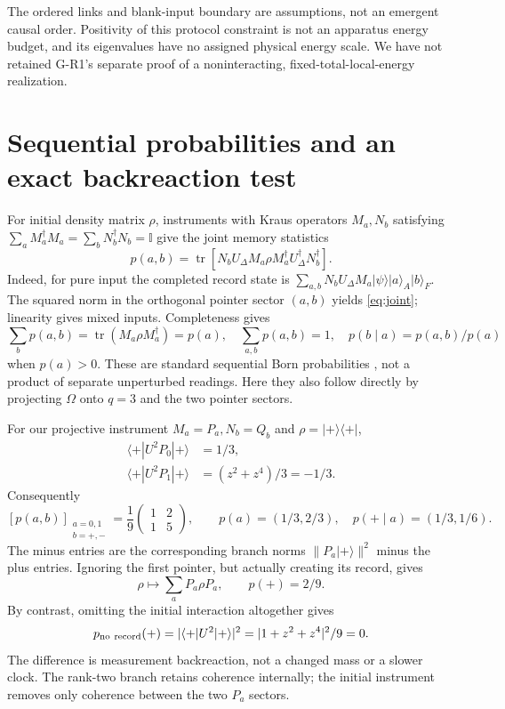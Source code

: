 \documentclass[11pt,a4paper]{article}
\newcommand{\id}{\mathbb I}
\newcommand{\tr}{\operatorname{tr}}
\newcommand{\ket}[1]{|#1\rangle}
\newcommand{\bra}[1]{\langle#1|}
\newcommand{\pr}[1]{\ket{#1}\bra{#1}}
\begin{document}
The ordered links and blank-input boundary are assumptions, not an
emergent causal order. Positivity of this protocol constraint is not
an apparatus energy budget, and its eigenvalues have no assigned
physical energy scale. We have not retained G-R1's separate proof
of a noninteracting, fixed-total-local-energy realization.

\newpage
\section{Sequential probabilities and an exact backreaction test}
For initial density matrix $\rho$, instruments with Kraus operators
$M_a,N_b$ satisfying $\sum_aM_a^\dagger M_a=\sum_bN_b^\dagger N_b=\id$
give the joint memory statistics
\begin{equation}\label{eq:joint}
 p(a,b)=\tr\!\left[
 N_bU_\Delta M_a\rho M_a^\dagger U_\Delta^\dagger N_b^\dagger
 \right] .
\end{equation}
Indeed, for pure input the completed record state is
$\sum_{a,b}N_bU_\Delta M_a\ket\psi\ket a_A\ket b_F$.
The squared norm in the orthogonal pointer sector $(a,b)$ yields
\eqref{eq:joint}; linearity gives mixed inputs. Completeness gives
\begin{equation}
 \sum_bp(a,b)=\tr(M_a\rho M_a^\dagger)=p(a),\quad
 \sum_{a,b}p(a,b)=1,\quad
 p(b\mid a)=p(a,b)/p(a)
\end{equation}
when $p(a)>0$. These are standard sequential Born probabilities
\cite{quantumtime}, not a product of separate unperturbed readings.
Here they also follow directly by projecting $\Omega$ onto $q=3$
and the two pointer sectors.

For our projective instrument $M_a=P_a,N_b=Q_b$ and $\rho=\pr+$,
\begin{align}
 \langle+|U^2P_0|+\rangle&=1/3,\\
 \langle+|U^2P_1|+\rangle&=(z^2+z^4)/3=-1/3 .
\end{align}
Consequently
\begin{equation}\label{eq:table}
 [p(a,b)]_{\substack{a=0,1\\b=+,-}}
 =\frac19\begin{pmatrix}1&2\\1&5\end{pmatrix},\qquad
 p(a)=(1/3,2/3),\quad
 p(+\mid a)=(1/3,1/6).
\end{equation}
The minus entries are the corresponding branch norms
$\|P_a\ket+\|^2$ minus the plus entries. Ignoring the first
pointer, but actually creating its record, gives
\begin{equation}
 \rho\longmapsto\sum_aP_a\rho P_a,\qquad p(+)=2/9 .
\end{equation}
By contrast, omitting the initial interaction altogether gives
\begin{equation}
 p_{\rm no\ record}(+)=|\langle+|U^2|+\rangle|^2
 =|1+z^2+z^4|^2/9=0 .
\end{equation}
The difference is measurement backreaction, not a changed mass or a
slower clock. The rank-two branch retains coherence internally;
the initial instrument removes only coherence between the two
$P_a$ sectors.
\end{document}
